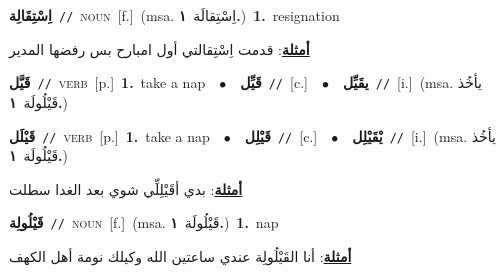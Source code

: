 \documentclass[10pt,a4paper,twoside]{article} %
\begin{document}
\begin{multicols}{2}
{\setlength\topsep{0pt}\textbf{\foreignlanguage{arabic}{اِسْتِقَالِة}}\ {\color{gray}\texttt{//}\color{black}}\ \textsc{noun}\ [f.]\ \color{gray}(msa. \foreignlanguage{arabic}{اِسْتِقالَة}~\foreignlanguage{arabic}{\textbf{١.}})\color{black}\ \textbf{1.}~resignation\  \begin{flushright}\color{gray}\foreignlanguage{arabic}{\textbf{\underline{\foreignlanguage{arabic}{أمثلة}}}: قدمت اِسْتِقالتي أول امبارح بس رفضها المدير}\end{flushright}\color{black}} \vspace{2mm}

{\setlength\topsep{0pt}\textbf{\foreignlanguage{arabic}{قَيَّل}}\ {\color{gray}\texttt{//}\color{black}}\ \textsc{verb}\ [p.]\ \textbf{1.}~take a nap\ \ $\bullet$\ \ \setlength\topsep{0pt}\textbf{\foreignlanguage{arabic}{قَيِّل}}\ {\color{gray}\texttt{//}\color{black}}\ [c.]\ \ $\bullet$\ \ \setlength\topsep{0pt}\textbf{\foreignlanguage{arabic}{يقَيِّل}}\ {\color{gray}\texttt{//}\color{black}}\ [i.]\ \color{gray}(msa. \foreignlanguage{arabic}{يأخُذ قَيْلُولَة}~\foreignlanguage{arabic}{\textbf{١.}})\color{black}\ } \vspace{2mm}

{\setlength\topsep{0pt}\textbf{\foreignlanguage{arabic}{قَيْلَل}}\ {\color{gray}\texttt{//}\color{black}}\ \textsc{verb}\ [p.]\ \textbf{1.}~take a nap\ \ $\bullet$\ \ \setlength\topsep{0pt}\textbf{\foreignlanguage{arabic}{قَيْلِل}}\ {\color{gray}\texttt{//}\color{black}}\ [c.]\ \ $\bullet$\ \ \setlength\topsep{0pt}\textbf{\foreignlanguage{arabic}{يْقَيْلِل}}\ {\color{gray}\texttt{//}\color{black}}\ [i.]\ \color{gray}(msa. \foreignlanguage{arabic}{يأخُذ قَيْلُولَة}~\foreignlanguage{arabic}{\textbf{١.}})\color{black}\  \begin{flushright}\color{gray}\foreignlanguage{arabic}{\textbf{\underline{\foreignlanguage{arabic}{أمثلة}}}: بدي أقَيْلِلِّي شوي بعد الغدا سطلت}\end{flushright}\color{black}} \vspace{2mm}

{\setlength\topsep{0pt}\textbf{\foreignlanguage{arabic}{قَيْلُولِة}}\ {\color{gray}\texttt{//}\color{black}}\ \textsc{noun}\ [f.]\ \color{gray}(msa. \foreignlanguage{arabic}{قَيْلُولَة}~\foreignlanguage{arabic}{\textbf{١.}})\color{black}\ \textbf{1.}~nap\  \begin{flushright}\color{gray}\foreignlanguage{arabic}{\textbf{\underline{\foreignlanguage{arabic}{أمثلة}}}: أنا القَيْلُولِة عندي ساعتين الله وكيلك نومة أهل الكهف}\end{flushright}\color{black}} \vspace{2mm}


\end{multicols}
\end{document}
